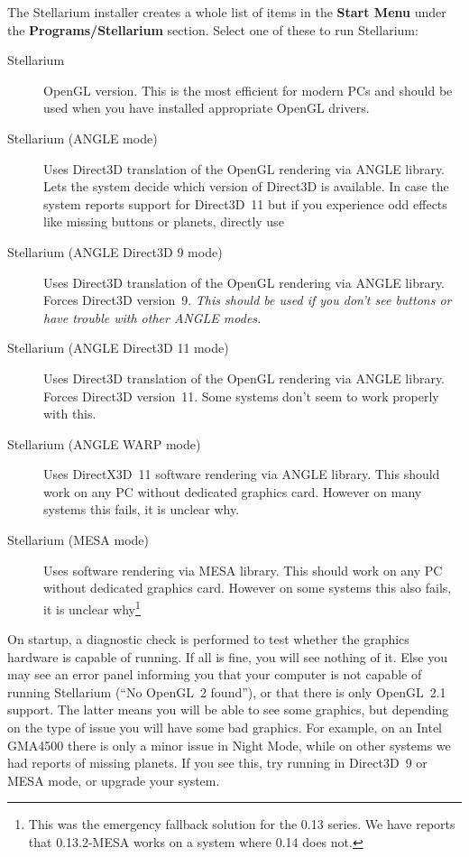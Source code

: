 The Stellarium installer creates a whole list of items in the
\textbf{Start Menu} under the \textbf{Programs/Stellarium}
section. Select one of these to run Stellarium:
\begin{description}
  \item[Stellarium] OpenGL version. This is the most efficient for
    modern PCs and should be used when you have installed appropriate
    OpenGL drivers.
  \item[Stellarium (ANGLE mode)] Uses Direct3D translation of the
    OpenGL rendering via ANGLE library. Lets the system decide which
    version of Direct3D is available. In case the system reports
    support for Direct3D~11 but if you experience odd effects like
    missing buttons or planets, directly use
  \item[Stellarium (ANGLE Direct3D 9 mode)] Uses Direct3D translation
    of the OpenGL rendering via ANGLE library. Forces Direct3D
    version~9. \emph{This should be used if you don't see buttons or have
    trouble with other ANGLE modes.}
  \item[Stellarium (ANGLE Direct3D 11 mode)] Uses Direct3D translation
    of the OpenGL rendering via ANGLE library. Forces Direct3D
    version~11. Some systems don't seem to work properly with this.
  \item[Stellarium (ANGLE WARP mode)] Uses DirectX3D~11 software rendering via ANGLE
    library. This should work on any PC without dedicated graphics
    card. However on many systems this fails, it is unclear why.
  \item[Stellarium (MESA mode)] Uses software rendering via MESA
    library. This should work on any PC without dedicated graphics
    card. However on some systems this also fails, it is unclear
    why\footnote{This was the emergency fallback solution for the 0.13
      series. We have reports that 0.13.2-MESA works on a system where
      0.14 does not.}
\end{description}
  On startup, a diagnostic check is performed to test whether the
  graphics hardware is capable of running. If all is fine, you will
  see nothing of it.  Else you may see an error panel informing you
  that your computer is not capable of running Stellarium (``No
  OpenGL~2 found''), or that there is only OpenGL~2.1 support. The
  latter means you will be able to see some graphics, but depending on
  the type of issue you will have some bad graphics. For example, on
  an Intel GMA4500 there is only a minor issue in Night Mode, while on
  other systems we had reports of missing planets. If you see this,
  try running in Direct3D~9 or MESA mode, or upgrade your system.

